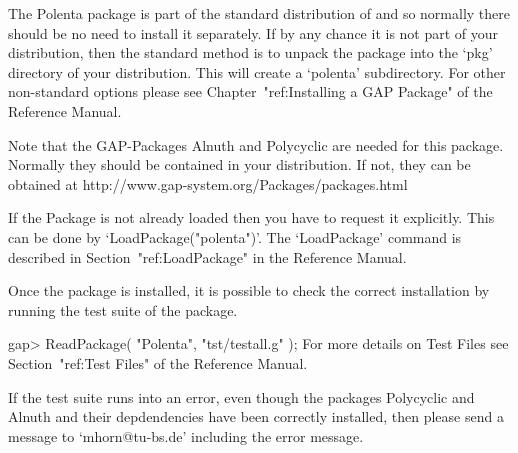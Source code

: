 
\null

The Polenta package is part of the standard distribution of {\GAP} and
so normally there should be no need to install it separately.
If by any chance it is not part of your {\GAP} distribution, then 
the standard method is to unpack	 the package into the `pkg'
directory  of your {\GAP} distribution.  This will create a `polenta'
subdirectory. 
For other non-standard options please see  Chapter~"ref:Installing a
GAP Package" of the {\GAP} Reference Manual.

Note that the GAP-Packages Alnuth and Polycyclic are needed for this package.
Normally they should be contained in your distribution. If not, 
they can be obtained at
\begintt
               http://www.gap-system.org/Packages/packages.html             

\endtt




\null

If the {\Polenta} Package is not already loaded 
then you have to request it explicitly. 
This  can be 
done by `LoadPackage("polenta")'.
The `LoadPackage' command is described in Section~"ref:LoadPackage"
in the {\GAP} Reference Manual.


    Once the package is installed, it is possible to check the correct
    installation by running the test suite of the package.

\beginexample
    gap> ReadPackage( "Polenta", "tst/testall.g" );
\endexample
    For more details on  Test Files see 
    Section~"ref:Test Files" of the 
    {\GAP} Reference Manual.

    If the test suite runs into an error, even though the packages
    Polycyclic and 
    Alnuth  and  their depdendencies
    have been correctly installed, then please send a message
    to `mhorn@tu-bs.de' including the error message.



